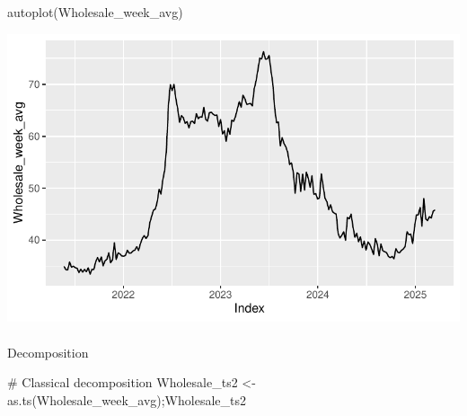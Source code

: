 \documentclass[
  letterpaper,
  DIV=11,
  numbers=noendperiod]{scrartcl}
\makeatletter
\let\oldparagraph\paragraph
\renewcommand{\paragraph}{
    \@ifstar
      \xxxParagraphStar
      \xxxParagraphNoStar
  }
\newcommand{\xxxParagraphStar}[1]{\oldparagraph*{#1}\mbox{}}
\newcommand{\xxxParagraphNoStar}[1]{\oldparagraph{#1}\mbox{}}
\newenvironment{Shaded}{\begin{snugshade}}{\end{snugshade}}
\newcommand{\CommentTok}[1]{\textcolor[rgb]{0.37,0.37,0.37}{#1}}
\newcommand{\FunctionTok}[1]{\textcolor[rgb]{0.28,0.35,0.67}{#1}}
\newcommand{\NormalTok}[1]{\textcolor[rgb]{0.00,0.23,0.31}{#1}}
\newcommand{\OtherTok}[1]{\textcolor[rgb]{0.00,0.23,0.31}{#1}}
\makeatother
\begin{document}
\begin{Shaded}
\begin{Highlighting}[]
\FunctionTok{autoplot}\NormalTok{(Wholesale\_week\_avg)}
\end{Highlighting}
\end{Shaded}

\includegraphics{Maize_analysis_files/figure-pdf/unnamed-chunk-23-1.pdf}

\paragraph{Decomposition}\label{decomposition-1}

\begin{Shaded}
\begin{Highlighting}[]
\CommentTok{\# Classical decomposition}
\NormalTok{Wholesale\_ts2 }\OtherTok{\textless{}{-}}\FunctionTok{as.ts}\NormalTok{(Wholesale\_week\_avg);Wholesale\_ts2}
\end{Highlighting}
\end{Shaded}
\end{document}
